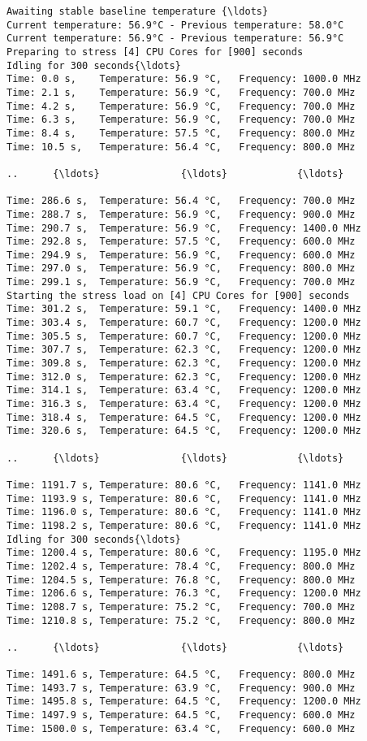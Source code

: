 \documentclass [oneside,10pt,a4paper,ngerman,BCOR10mm,headsepline,parindent,final]{scrartcl}
\begin{document}
    \begin{Verbatim}[commandchars=\\\{\}]
Awaiting stable baseline temperature {\ldots}
Current temperature: 56.9°C - Previous temperature: 58.0°C
Current temperature: 56.9°C - Previous temperature: 56.9°C
Preparing to stress [4] CPU Cores for [900] seconds
Idling for 300 seconds{\ldots}
Time: 0.0 s,    Temperature: 56.9 °C,   Frequency: 1000.0 MHz
Time: 2.1 s,    Temperature: 56.9 °C,   Frequency: 700.0 MHz
Time: 4.2 s,    Temperature: 56.9 °C,   Frequency: 700.0 MHz
Time: 6.3 s,    Temperature: 56.9 °C,   Frequency: 700.0 MHz
Time: 8.4 s,    Temperature: 57.5 °C,   Frequency: 800.0 MHz
Time: 10.5 s,   Temperature: 56.4 °C,   Frequency: 800.0 MHz

..      {\ldots}              {\ldots}            {\ldots}

Time: 286.6 s,  Temperature: 56.4 °C,   Frequency: 700.0 MHz
Time: 288.7 s,  Temperature: 56.9 °C,   Frequency: 900.0 MHz
Time: 290.7 s,  Temperature: 56.9 °C,   Frequency: 1400.0 MHz
Time: 292.8 s,  Temperature: 57.5 °C,   Frequency: 600.0 MHz
Time: 294.9 s,  Temperature: 56.9 °C,   Frequency: 600.0 MHz
Time: 297.0 s,  Temperature: 56.9 °C,   Frequency: 800.0 MHz
Time: 299.1 s,  Temperature: 56.9 °C,   Frequency: 700.0 MHz
Starting the stress load on [4] CPU Cores for [900] seconds
Time: 301.2 s,  Temperature: 59.1 °C,   Frequency: 1400.0 MHz
Time: 303.4 s,  Temperature: 60.7 °C,   Frequency: 1200.0 MHz
Time: 305.5 s,  Temperature: 60.7 °C,   Frequency: 1200.0 MHz
Time: 307.7 s,  Temperature: 62.3 °C,   Frequency: 1200.0 MHz
Time: 309.8 s,  Temperature: 62.3 °C,   Frequency: 1200.0 MHz
Time: 312.0 s,  Temperature: 62.3 °C,   Frequency: 1200.0 MHz
Time: 314.1 s,  Temperature: 63.4 °C,   Frequency: 1200.0 MHz
Time: 316.3 s,  Temperature: 63.4 °C,   Frequency: 1200.0 MHz
Time: 318.4 s,  Temperature: 64.5 °C,   Frequency: 1200.0 MHz
Time: 320.6 s,  Temperature: 64.5 °C,   Frequency: 1200.0 MHz

..      {\ldots}              {\ldots}            {\ldots}

Time: 1191.7 s, Temperature: 80.6 °C,   Frequency: 1141.0 MHz
Time: 1193.9 s, Temperature: 80.6 °C,   Frequency: 1141.0 MHz
Time: 1196.0 s, Temperature: 80.6 °C,   Frequency: 1141.0 MHz
Time: 1198.2 s, Temperature: 80.6 °C,   Frequency: 1141.0 MHz
Idling for 300 seconds{\ldots}
Time: 1200.4 s, Temperature: 80.6 °C,   Frequency: 1195.0 MHz
Time: 1202.4 s, Temperature: 78.4 °C,   Frequency: 800.0 MHz
Time: 1204.5 s, Temperature: 76.8 °C,   Frequency: 800.0 MHz
Time: 1206.6 s, Temperature: 76.3 °C,   Frequency: 1200.0 MHz
Time: 1208.7 s, Temperature: 75.2 °C,   Frequency: 700.0 MHz
Time: 1210.8 s, Temperature: 75.2 °C,   Frequency: 800.0 MHz

..      {\ldots}              {\ldots}            {\ldots}

Time: 1491.6 s, Temperature: 64.5 °C,   Frequency: 800.0 MHz
Time: 1493.7 s, Temperature: 63.9 °C,   Frequency: 900.0 MHz
Time: 1495.8 s, Temperature: 64.5 °C,   Frequency: 1200.0 MHz
Time: 1497.9 s, Temperature: 64.5 °C,   Frequency: 600.0 MHz
Time: 1500.0 s, Temperature: 63.4 °C,   Frequency: 600.0 MHz
    \end{Verbatim}
\end{document}
